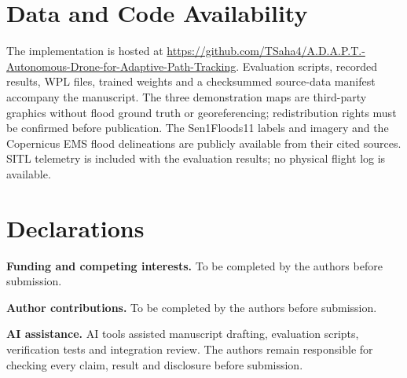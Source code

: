 \section*{Data and Code Availability}
The implementation is hosted at \url{https://github.com/TSaha4/A.D.A.P.T.-Autonomous-Drone-for-Adaptive-Path-Tracking}. Evaluation scripts, recorded results, WPL files, trained weights and a checksummed source-data manifest accompany the manuscript. The three demonstration maps are third-party graphics without flood ground truth or georeferencing; redistribution rights must be confirmed before publication. The Sen1Floods11 labels and imagery and the Copernicus EMS flood delineations are publicly available from their cited sources. SITL telemetry is included with the evaluation results; no physical flight log is available.

\section*{Declarations}
\textbf{Funding and competing interests.} To be completed by the authors before submission.

\textbf{Author contributions.} To be completed by the authors before submission.

\textbf{AI assistance.} AI tools assisted manuscript drafting, evaluation scripts, verification tests and integration review. The authors remain responsible for checking every claim, result and disclosure before submission.
